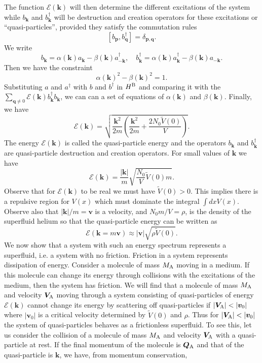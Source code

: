 The function $\mathcal{E}(\bm{k})$  will then determine the different excitations of the system while $b_{\bm{k}}$ and $b^{\dagger}_{\bm{k}}$ will be destruction and creation operators for these excitations or ``quasi-particles'', provided they satisfy the commutation rules
\[[b_{\bm{p}},b_{\bm{q}}^{\dagger}] = \delta_{\bm{p},\bm{q}}.\]
We write
\[b_{\bm{k}} = \alpha(\bm{k})a_{\bm{k}} - \beta(\bm{k})a^{\dagger}_{-\bm{k}} , \quad b^{\dagger}_{\bm{k}} = \alpha(\bm{k})a^{\dagger}_{\bm{k}} - \beta(\bm{k})a_{-\bm{k}} .\]
Then we have the constraint
\[\alpha(\bm{k})^2 - \beta(\bm{k})^2 = 1.\]
Substituting $a$ and $a^{\dagger}$ with $b$ and $b^{\dagger}$ in $H^{\rm B}$ and comparing it with the $\sum_{\bm{q} \neq 0} \mathcal{E}(\bm{k})b^{\dagger}_{\bm{k}} b_{\bm{k}}$, we can can a set of equations of $\alpha(\bm{k})$ and $\beta(\bm{k})$. Finally, we have
\[\mathcal{E}(\bm{k}) = \sqrt{\frac{\bm{k}^2}{2m} \left(\frac{\bm{k}^2}{2m} + \frac{2N_0\tilde{V}(0)}{V} \right) }.\]
The energy $\mathcal{E}(\bm{k})$ is called the quasi-particle energy and the operators $b_{\bm{k}}$ and $b^{\dagger}_{\bm{k}}$ are quasi-particle destruction and creation operators. 
For small values of $\bm{k}$ we have
\[\mathcal{E}(\bm{k}) = \frac{|\bm{k}|}{m} \sqrt{\frac{N_0}{V}\tilde{V}(0)m}.\]
Observe that for $\mathcal{E}(\bm{k})$ to be real we must have $\tilde{V}(0) > 0$. This implies there is a repulsive region for $V(x)$ which must dominate the integral $\int dx V(x)$. Observe also that $|\bm{k}|/m = \bm{v}$ is a velocity, and $N_0m/V = \rho$, is the density of the superfluid helium so that the quasi-particle energy can be written as 
\[\mathcal{E}(\bm{k} = m\bm{v}) \approx |\bm{v}|\sqrt{\rho\tilde{V}(0)}.\]
We now show that a system with such an energy spectrum represents a superfluid, i.e. a system with no friction.
Friction in a system represents dissipation of energy.
Consider a molecule of mass $M_{\rm A}$ moving in a medium. If this molecule can change its energy through collisions with the excitations of the medium, then the system has friction. 
We will find that a molecule of mass $M_{\rm A}$ and velocity $\bm{V}_{\rm A}$ moving through a system consisting of quasi-particles of energy $\mathcal{E}(\bm{k})$ cannot change its energy by scattering off quasi-particles if $|\bm{V}_{\rm A}| < |\bm{v}_0|$ where $|\bm{v}_0|$ is a critical velocity determined by $\tilde{V}(0)$ and $\rho$. 
Thus for $|\bm{V}_{\rm A}| < |\bm{v}_0|$ the system of quasi-particles behaves as a frictionless superfluid.
To see this, let us consider the collision of a molecule of mass $M_{\rm A}$ and velocity $\bm{V}_{\rm A}$ with a quasi-particle at rest. If the final momentum of the molecule is $\bm{Q}_{\rm A}$ and that of the quasi-particle is $\bm{k}$, we have, from momentum conservation,
